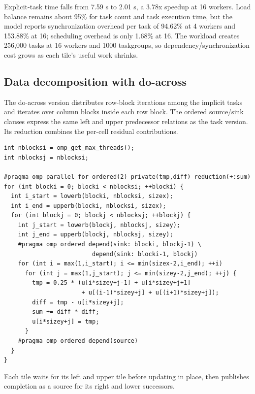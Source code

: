 \documentclass[11pt,a4paper]{article}
\begin{document}
Explicit-task time falls from 7.59 s to 2.01 s, a 3.78x speedup at
16 workers. Load balance remains about 95\% for task count and task
execution time, but the model reports synchronization overhead per
task of 94.62\% at 4 workers and 153.88\% at 16; scheduling overhead
is only 1.68\% at 16. The workload creates 256,000 tasks at 16 workers
and 1000 taskgroups, so dependency/synchronization cost grows as each
tile's useful work shrinks.

\subsection{Data decomposition with do-across}

The do-across version distributes row-block iterations among the
implicit tasks and iterates over column blocks inside each row block.
The ordered source/sink clauses express the same left and upper
predecessor relations as the task version. Its reduction combines the
per-cell residual contributions.

\begin{lstlisting}[caption={Gauss--Seidel do-across dependency loop (v2).}]
int nblocksi = omp_get_max_threads();
int nblocksj = nblocksi;

#pragma omp parallel for ordered(2) private(tmp,diff) reduction(+:sum)
for (int blocki = 0; blocki < nblocksi; ++blocki) {
  int i_start = lowerb(blocki, nblocksi, sizex);
  int i_end = upperb(blocki, nblocksi, sizex);
  for (int blockj = 0; blockj < nblocksj; ++blockj) {
    int j_start = lowerb(blockj, nblocksj, sizey);
    int j_end = upperb(blockj, nblocksj, sizey);
    #pragma omp ordered depend(sink: blocki, blockj-1) \
                         depend(sink: blocki-1, blockj)
    for (int i = max(1,i_start); i <= min(sizex-2,i_end); ++i)
      for (int j = max(1,j_start); j <= min(sizey-2,j_end); ++j) {
        tmp = 0.25 * (u[i*sizey+j-1] + u[i*sizey+j+1]
                      + u[(i-1)*sizey+j] + u[(i+1)*sizey+j]);
        diff = tmp - u[i*sizey+j];
        sum += diff * diff;
        u[i*sizey+j] = tmp;
      }
    #pragma omp ordered depend(source)
  }
}
\end{lstlisting}

Each tile waits for its left and upper tile before updating in place,
then publishes completion as a source for its right and lower
successors.


\end{document}
